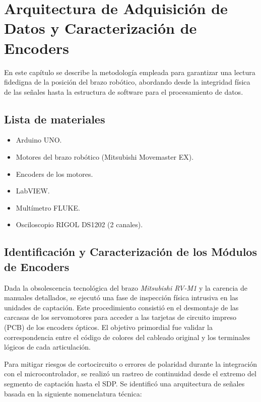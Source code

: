 \chapter{Arquitectura de Adquisición de Datos y Caracterización de Encoders}

\lineaLateral
\begin{resumenCapitulo}
	En este capítulo se describe la metodología empleada para garantizar una lectura fidedigna de la posición del brazo robótico, abordando desde la integridad física de las señales hasta la estructura de software para el procesamiento de datos.
\end{resumenCapitulo}

\section{Lista de materiales}
\begin{itemize}
	\item Arduino UNO.
	\item Motores del brazo robótico (Mitsubishi Movemaster EX).
	\item Encoders de los motores.
	\item LabVIEW.
	\item Multímetro FLUKE.
	\item Osciloscopio RIGOL DS1202 (2 canales).
\end{itemize}


\section{Identificación y Caracterización de los Módulos de Encoders}

Dada la obsolescencia tecnológica del brazo \textit{Mitsubishi RV-M1} y la carencia de manuales detallados, se ejecutó una fase de inspección física intrusiva en las unidades de captación. Este procedimiento consistió en el desmontaje de las carcasas de los servomotores para acceder a las tarjetas de circuito impreso (PCB) de los encoders ópticos. El objetivo primordial fue validar la correspondencia entre el código de colores del cableado original y los terminales lógicos de cada articulación.

Para mitigar riesgos de cortocircuito o errores de polaridad durante la integración con el microcontrolador, se realizó un rastreo de continuidad desde el extremo del segmento de captación hasta el SDP. Se identificó una arquitectura de señales basada en la siguiente nomenclatura técnica:

